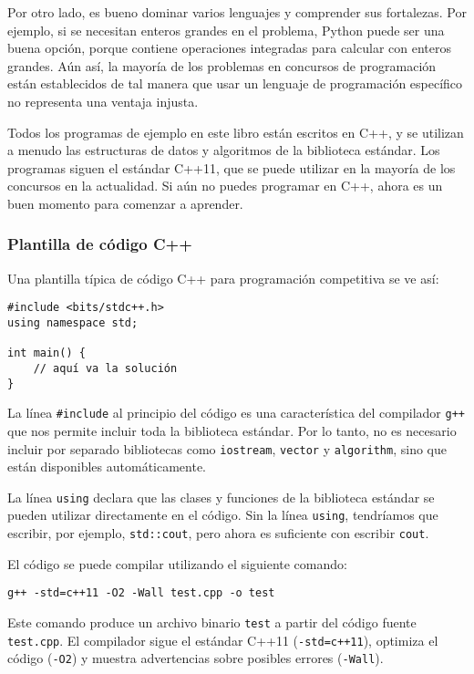 Por otro lado, es bueno
dominar varios lenguajes y comprender
sus fortalezas.
Por ejemplo, si se necesitan enteros grandes
en el problema,
Python puede ser una buena opción, porque
contiene operaciones integradas para
calcular con enteros grandes.
Aún así, la mayoría de los problemas en concursos de programación
están establecidos de tal manera que
usar un lenguaje de programación específico
no representa una ventaja injusta.

Todos los programas de ejemplo en este libro están escritos en C++,
y se utilizan a menudo las estructuras de datos y algoritmos
de la biblioteca estándar.
Los programas siguen el estándar C++11,
que se puede utilizar en la mayoría de los concursos en la actualidad.
Si aún no puedes programar en C++,
ahora es un buen momento para comenzar a aprender.

\subsubsection{Plantilla de código C++}

Una plantilla típica de código C++ para programación competitiva
se ve así:

\begin{lstlisting}
#include <bits/stdc++.h>
using namespace std;

int main() {
    // aquí va la solución
}
\end{lstlisting}

La línea \texttt{\#include} al principio
del código es una característica del compilador \texttt{g++}
que nos permite incluir toda la biblioteca estándar.
Por lo tanto, no es necesario incluir por separado
bibliotecas como \texttt{iostream},
\texttt{vector} y \texttt{algorithm},
sino que están disponibles automáticamente.

La línea \texttt{using} declara
que las clases y funciones
de la biblioteca estándar se pueden utilizar directamente
en el código.
Sin la línea \texttt{using}, tendríamos
que escribir, por ejemplo, \texttt{std::cout},
pero ahora es suficiente con escribir \texttt{cout}.

El código se puede compilar utilizando el siguiente comando:

\begin{lstlisting}
g++ -std=c++11 -O2 -Wall test.cpp -o test
\end{lstlisting}

Este comando produce un archivo binario \texttt{test}
a partir del código fuente \texttt{test.cpp}.
El compilador sigue el estándar C++11
(\texttt{-std=c++11}),
optimiza el código (\texttt{-O2})
y muestra advertencias sobre posibles errores (\texttt{-Wall}).

